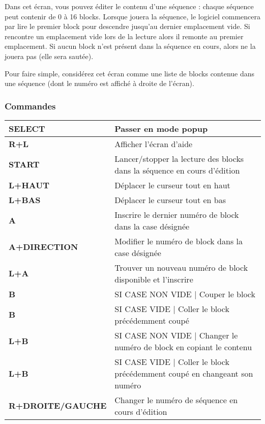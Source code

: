 Dans cet écran, vous pouvez éditer le contenu d'une séquence : chaque séquence peut contenir de 0 à 16 blocks.
Lorsque \FAT jouera la séquence, le logiciel commencera par lire le premier block pour descendre jusqu'au dernier emplacement vide.
Si \FAT rencontre un emplacement vide lors de la lecture alors il remonte au premier emplacement.
Si aucun block n'est présent dans la séquence en cours, alors \FAT ne la jouera pas (elle sera sautée).
\medskip

Pour faire simple, considérez cet écran comme une liste de blocks contenue dans une séquence (dont le numéro est affiché à droite de l'écran).


\subsubsection{Commandes}
\tablelasttail{\hline}
\begin{supertabular}{|l|p{11cm}|}
\hline
    {\bf SELECT} & Passer en mode popup \\
    \hline
    {\bf R+L} & Afficher l'écran d'aide \\
    \hline
    {\bf START} & Lancer/stopper la lecture des blocks dans la séquence en cours d'édition \\
    \hline
    {\bf L+HAUT} & Déplacer le curseur tout en haut \\
    \hline
    {\bf L+BAS} & Déplacer le curseur tout en bas \\
    \hline
    {\bf A} & Inscrire le dernier numéro de block dans la case désignée \\
    \hline
    {\bf A+DIRECTION} & Modifier le numéro de block dans la case désignée \\
    \hline
    {\bf L+A} & Trouver un nouveau numéro de block disponible et l'inscrire \\
    \hline
    {\bf B} & SI CASE NON VIDE | Couper le block \\
    \hline
    {\bf B} & SI CASE VIDE | Coller le block précédemment coupé \\
    \hline
    {\bf L+B} & SI CASE NON VIDE | Changer le numéro de block en copiant le contenu \\
    \hline
    {\bf L+B} & SI CASE VIDE | Coller le block précédemment coupé en changeant son numéro \\
    \hline
    {\bf R+DROITE/GAUCHE} & Changer le numéro de séquence en cours d'édition \\
\hline
\end{supertabular}
